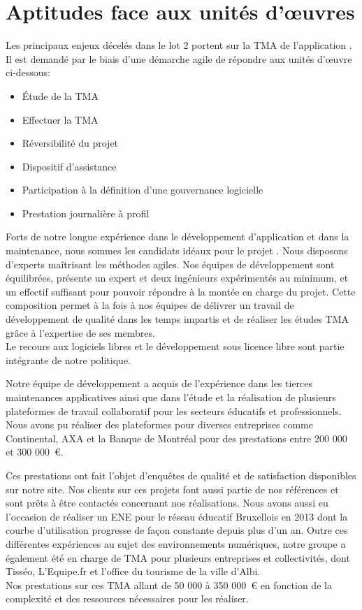 \section{Aptitudes face aux unités d'œuvres}
	Les principaux enjeux décelés dans le lot 2 portent sur la TMA de l’application \correlyce{}. Il est demandé par le biais d’une démarche agile de répondre aux unités d’œuvre ci-dessous: 
	
	\begin{itemize}
		\item Étude de la TMA
		\item Effectuer la TMA
		\item Réversibilité du projet
		\item Dispositif d’assistance
		\item Participation à la définition d’une gouvernance logicielle
		\item Prestation journalière à profil 
	\end{itemize}

	Forts de notre longue expérience dans le développement d’application et dans la maintenance, nous sommes les candidats idéaux pour le projet \correlyce{}. Nous disposons d’experts maîtrisant les méthodes agiles. Nos équipes de développement sont équilibrées, présente un expert et deux ingénieurs expérimentés au minimum, et un effectif suffisant pour pouvoir répondre à la montée en charge du projet. Cette composition permet à la fois à nos équipes de délivrer un travail de développement de qualité dans les temps impartis et de réaliser les études TMA grâce à l’expertise de ses membres. \\ Le recours aux logiciels libres et le développement sous licence libre sont partie intégrante de notre politique.
	
	Notre équipe de développement a acquis de l’expérience dans les tierces maintenances applicatives ainsi que dans l’étude et la réalisation de plusieurs plateformes de travail collaboratif pour les secteurs éducatifs et professionnels. Nous avons pu réaliser des plateformes pour diverses entreprises comme Continental, AXA et la Banque de Montréal pour des prestations entre 200 000 et 300 000~\euro{}.
	
	Ces prestations ont fait l’objet d’enquêtes de qualité et de satisfaction disponibles sur notre site. Nos clients sur ces projets font aussi partie de nos références et sont prêts à être contactés concernant nos réalisations. Nous avons aussi eu l’occasion de réaliser un ENE pour le réseau éducatif Bruxellois en 2013 dont la courbe d’utilisation progresse de façon constante depuis plus d’un an. Outre ces différentes expériences au sujet des environnements numériques, notre groupe a également été en charge de TMA pour plusieurs entreprises et collectivités, dont Tisséo, L'Equipe.fr et l’office du tourisme de la ville d’Albi.\\
	Nos prestations sur ces TMA allant de 50 000 à 350 000~\euro{} en fonction de la complexité et des ressources nécessaires pour les réaliser.
	
